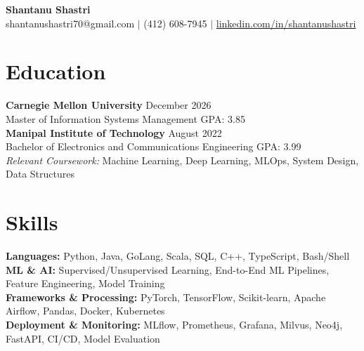 \documentclass[11pt,a4paper]{article}
\begin{document}
\begin{center}
    \Huge \textbf{Shantanu Shastri} \\
    \vspace{2pt}
    \small shantanushastri70@gmail.com $|$ (412) 608-7945 $|$ \href{https://linkedin.com/in/shantanushastri}{linkedin.com/in/shantanushastri}
\end{center}

\vspace{-5pt}
\section{Education}
\noindent
\textbf{Carnegie Mellon University} \hfill December 2026 \\
Master of Information Systems Management \hfill GPA: 3.85 \\
\textbf{Manipal Institute of Technology} \hfill August 2022 \\
Bachelor of Electronics and Communications Engineering \hfill GPA: 3.99 \\
\textit{Relevant Coursework:} Machine Learning, Deep Learning, MLOps, System Design, Data Structures

\vspace{-5pt}
\section{Skills}
\noindent
\textbf{Languages:} Python, Java, GoLang, Scala, SQL, C++, TypeScript, Bash/Shell \\
\textbf{ML \& AI:} Supervised/Unsupervised Learning, End-to-End ML Pipelines, Feature Engineering, Model Training \\
\textbf{Frameworks \& Processing:} PyTorch, TensorFlow, Scikit-learn, Apache Airflow, Pandas, Docker, Kubernetes \\
\textbf{Deployment \& Monitoring:} MLflow, Prometheus, Grafana, Milvus, Neo4j, FastAPI, CI/CD, Model Evaluation

\vspace{-5pt}
\end{document}
